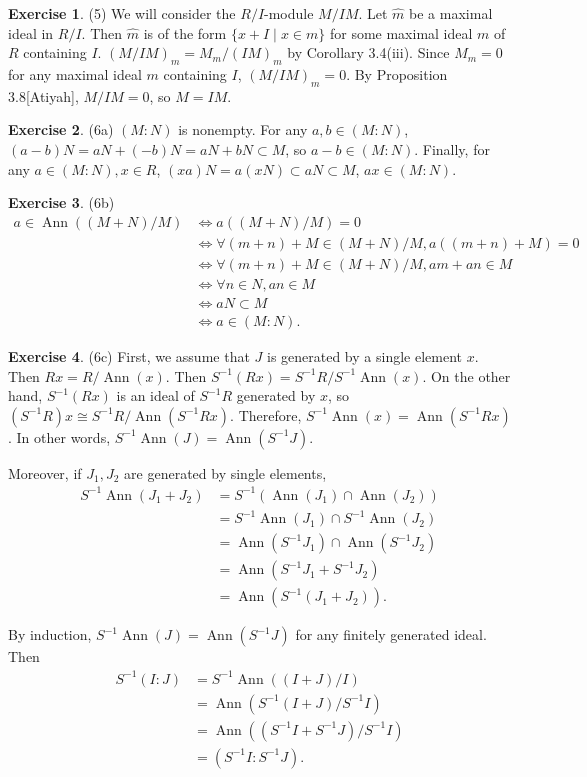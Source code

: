 \documentclass[12pt, psamsfonts]{amsart}
\theoremstyle{definition}
\newtheorem*{exer}{Exercise}
\theoremstyle{remark}
\DeclareMathOperator{\Ann}{Ann}
\numberwithin{equation}{section}
\begin{document}
\begin{exer}{(5)}
  We will consider the $R / I$-module $M / IM$.
  Let $\hat{m}$ be a maximal ideal in $R / I$.
  Then $\hat{m}$ is of the form $\{ x + I \mid x \in m \}$ for some maximal ideal $m$ of $R$ containing $I$.
  $(M / IM)_{m} = M_m / (IM)_m$ by Corollary 3.4(iii).
  Since $M_m = 0$ for any maximal ideal $m$ containing $I$, $(M / IM)_{m} = 0$.
  By Proposition 3.8[Atiyah], $M / IM = 0$, so $M = IM$.
\end{exer}

\begin{exer}{(6a)}
  $(M:N)$ is nonempty.
  For any $a, b \in (M:N)$, $(a - b)N = aN + (-b)N = aN + bN \subset M$, so $a - b \in (M:N)$.
  Finally, for any $a \in (M:N), x \in R$, $(xa)N = a(xN) \subset aN \subset M$, $ax \in (M:N)$.
\end{exer}

\begin{exer}{(6b)}
  $ $
  \begin{align*}
    a \in \Ann((M + N) / M)
      &\iff a((M + N) / M) = 0 \\
      &\iff \forall (m + n) + M \in (M + N) / M, a((m + n) + M) = 0 \\
      &\iff \forall (m + n) + M \in (M + N) / M, am + an \in M \\
      &\iff \forall n \in N, an \in M \\
      &\iff aN \subset M \\
      &\iff a \in (M:N).
  \end{align*}
\end{exer}

\begin{exer}{(6c)}
  First, we assume that $J$ is generated by a single element $x$.
  Then $Rx = R / \Ann(x)$.
  Then $S^{-1}(Rx) = S^{-1}R / S^{-1}\Ann(x)$.
  On the other hand, $S^{-1}(Rx)$ is an ideal of $S^{-1}R$ generated by $x$, so $(S^{-1}R)x \cong S^{-1}R / \Ann(S^{-1}Rx)$.
  Therefore, $S^{-1}\Ann(x) = \Ann(S^{-1}Rx)$.
  In other words, $S^{-1}\Ann(J) = \Ann(S^{-1}J)$.

  Moreover, if $J_1, J_2$ are generated by single elements, 
  \begin{align*}
    S^{-1}\Ann(J_1 + J_2)
      &= S^{-1}(\Ann(J_1) \cap \Ann(J_2)) \\
      &= S^{-1}\Ann(J_1) \cap S^{-1}\Ann(J_2) \\
      &= \Ann(S^{-1}J_1) \cap \Ann(S^{-1}J_2) \\
      &= \Ann(S^{-1}J_1 + S^{-1}J_2) \\
      &= \Ann(S^{-1}(J_1 + J_2)).
  \end{align*}

  By induction, $S^{-1}\Ann(J) = \Ann(S^{-1}J)$ for any finitely generated ideal.
  Then 
  \begin{align*}
    S^{-1}(I:J)
      &= S^{-1}\Ann((I + J) / I) \\
      &= \Ann(S^{-1}(I + J) / S^{-1}I) \\
      &= \Ann((S^{-1}I + S^{-1}J) / S^{-1}I) \\
      &= (S^{-1}I:S^{-1}J).
  \end{align*}
\end{exer}
\end{document}
